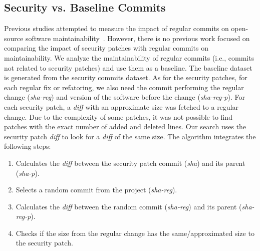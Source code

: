 \documentclass[smallextended]{svjour3}       %
\begin{document}
%
\subsection{Security vs. Baseline Commits}
%
Previous studies attempted to measure the impact of regular commits 
on open-source software maintainability~\cite{HEGEDUS2018313}. 
However, there is no previous work focused on comparing the impact 
of security patches with regular commits on maintainability.
We analyze the maintainability of regular commits (i.e., commits not 
related to security patches) and use them as a baseline.
The baseline dataset is generated from the security commits dataset. 
As for the security patches, for each regular fix or refatoring, we also need the commit performing the regular change (\emph{sha-reg}) and version of 
the software before the change (\emph{sha-reg-p}). For each security patch, 
a \emph{diff} with an approximate size was fetched to a regular 
change. Due to the complexity of some patches, it was not possible 
to find patches with the exact number of added and deleted lines. 
Our search uses the security patch \emph{diff} to look for a 
\emph{diff} of the same size. The algorithm integrates the following 
steps:

\begin{enumerate}
\item Calculates the \emph{diff} between the security patch commit 
(\emph{sha}) and its parent (\emph{sha-p}).
\item Selects a random commit from the project (\emph{sha-reg}).
\item Calculates the \emph{diff} between the random commit (\emph{sha-reg}) and its parent (\emph{sha-reg-p}).
\item Checks if the size from the regular change has the 
same/approximated size to the security patch.
\end{enumerate}
\end{document}

